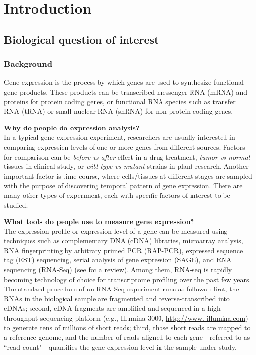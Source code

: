 	
\section{Introduction}\label{sec:intro}
	
\subsection{Biological question of interest}\label{subsec:biol}
	
		\subsubsection{Background}
	Gene expression is the process by which genes are used to synthesize functional gene products. These products can be transcribed messenger RNA (mRNA) and proteins for protein coding genes, or functional RNA species such as transfer RNA (tRNA) or small nuclear RNA (snRNA) for non-protein coding genes. 
	

	\textbf{Why do people do expression analysis?}\\
	In a typical gene expression experiment, researchers are usually interested in comparing expression levels of one or more genes from different sources. Factors for comparison can be \textit{before vs after} effect in a drug treatment, \textit{tumor vs normal} tissues in clinical study, or \textit{wild type vs mutant} strains in plant research. Another important factor is time-course, where cells/tissues at different stages are sampled with the purpose of discovering temporal pattern of gene expression. There are many other types of experiment, each with specific factors of interest to be studied.
	
	\textbf{What tools do people use to measure gene expression?}\\
	 The expression profile or expression level of a gene can be measured using techniques such as complementary DNA (cDNA) libraries, microarray analysis, RNA fingerprinting by arbitrary primed PCR (RAP-PCR), expressed sequence tag (EST) sequencing, serial analysis of gene expression (SAGE), and RNA sequencing (RNA-Seq) (see \cite{casassola2013gene} for a review).
	 Among them, RNA-seq is rapidly becoming technology of choice for transcriptome profiling over the past few years. The standard procedure of an RNA-Seq experiment runs as follows  \citep{finotello2015measuring}: first, the RNAs in the biological sample are fragmented and reverse-transcribed into cDNAs; second, cDNA fragments are amplified and sequenced in a high-throughput sequencing platform (e.g., Illumina 3000, \url{http://www. illumina.com}) to generate tens of millions of short reads; third, those short reads are mapped to a reference genome, and the number of reads aligned to each gene---referred to as ``read count"---quantifies the gene expression level in the sample under study.  
	 
